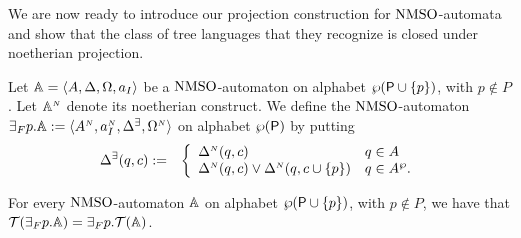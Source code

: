 We are now ready to introduce our projection construction for $\mathrm{NMSO}$-automata and show that the class of tree languages that they recognize is closed under noetherian
projection.
\begin{definition}\label{DEF_fin_projection}
Let $\mathbb{A} = \langle{A,\Delta,\Omega,a_I}\rangle$ be a $\mathrm{NMSO}$-automaton on alphabet $\wp(\mathsf{P} \cup \{p\})$, with $p \not\in P$. Let $\mathbb{A}^{{\scriptscriptstyle N}}$
denote its noetherian construct.
We define the $\mathrm{NMSO}$-automaton ${{\exists}_F p}.\mathbb{A} := \langle A^{{\scriptscriptstyle N}}, a_I^{{\scriptscriptstyle N}},
\Delta^\exists, \Omega^{{\scriptscriptstyle N}}\rangle$ on alphabet $\wp(\mathsf{P})$ by putting
\begin{eqnarray*}
\Delta^\exists(q,c) &:=& \left\{
	\begin{array}{ll}
        \Delta^{{\scriptscriptstyle N}}(q,c) & q\in A \\
		\Delta^{{\scriptscriptstyle N}}(q,c) \vee \Delta^{{\scriptscriptstyle N}}(q,c\cup\{p\}) & q \in A^{\wp}.
	\end{array}
\right.
\end{eqnarray*}
\end{definition}
\begin{proposition}\label{PROP_fin_projection}
For every $\mathrm{NMSO}$-automaton $\mathbb{A}$ on alphabet ${\wp (\mathsf{P} \cup \{p\})}$, with $p \not\in P$, we have that $\mathcal{T}({{\exists}_F p}.\mathbb{A}) = {{\exists}_F p}.\mathcal{T}(\mathbb{A})$.
\end{proposition}

